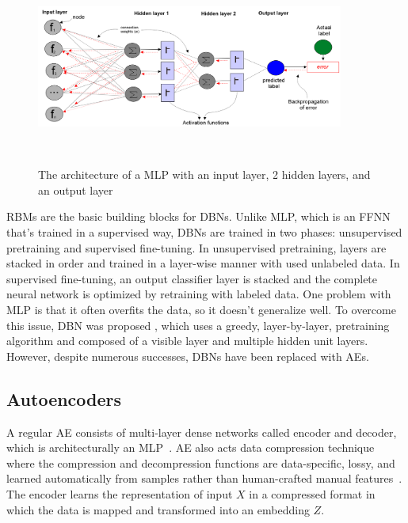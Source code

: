 \begin{figure}[h]
    \centering
    \includegraphics[width=0.9\textwidth,height=65mm]{images/ffnn_1.png}
    \caption{The architecture of a MLP with an input layer, 2 hidden layers, and an output layer}
    \label{fig:mlp_1}
\end{figure}

\hspace*{3.5mm} RBMs are the basic building blocks for DBNs. Unlike MLP, which is an FFNN that's trained in a supervised way, DBNs are trained in two phases: unsupervised pretraining and supervised fine-tuning. In unsupervised pretraining, layers are stacked in order and trained in a layer-wise manner with used unlabeled data. In supervised fine-tuning, an output classifier layer is stacked and the complete neural network is optimized by retraining with labeled data. One problem with MLP is that it often overfits the data, so it doesn't generalize well. To overcome this issue, DBN was proposed , which uses a greedy, layer-by-layer, pretraining algorithm and composed of a visible layer and multiple hidden unit layers. However, despite numerous successes, DBNs have been replaced with AEs. 

\subsection{Autoencoders}
\label{preli:AEs}
A regular AE consists of multi-layer dense networks called encoder and decoder, which is architecturally an MLP~\cite{karimDLTF2018}. AE also acts data compression technique where the compression and decompression functions are data-specific, lossy, and learned automatically from samples rather than human-crafted manual features~\cite{karimDLTF2018}. The encoder learns the representation of input $X$ in a compressed format in which the data is mapped and transformed into an embedding $Z$.  

